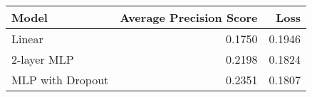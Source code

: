 \begin{tabular}{lrr}
\toprule
Model &  Average Precision Score &      Loss \\
\midrule
Linear   &                 0.1750 &  0.1946 \\
  2-layer MLP &                 0.2198 &  0.1824 \\
  MLP with Dropout & 0.2351 & 0.1807 \\
\bottomrule
\end{tabular}
